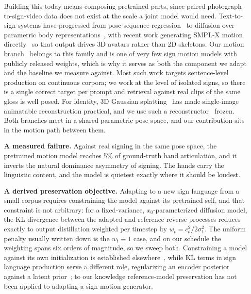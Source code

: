 \documentclass{article}
\begin{document}
Building this today means composing pretrained parts, since paired
photograph-to-sign-video data does not exist at the scale a joint model would
need. Text-to-sign systems have progressed from pose-sequence
regression~\cite{saunders2020progressive} to diffusion over parametric body
representations~\cite{baltatzis2024nsa}, with recent work generating SMPL-X
motion directly~\cite{dong2024signavatar,zuo2025soke} so that output drives 3D
avatars rather than 2D skeletons. Our motion branch~\cite{bensabath2026handmdm}
belongs to this family and is one of very few sign motion models with publicly
released weights, which is why it serves as both the component we adapt and the
baseline we measure against. Most such work targets sentence-level production on
continuous corpora; we work at the level of isolated signs, so there is a single
correct target per prompt and retrieval against real clips of the same gloss is
well posed. For identity, 3D Gaussian splatting~\cite{kerbl20233dgs} has made
single-image animatable reconstruction practical, and we use such a
reconstructor~\cite{qiu2025lhm} frozen. Both branches meet in a shared parametric
pose space, and our contribution sits in the motion path between them.

\noindent\textbf{A measured failure.} Against real signing in the same pose
space, the pretrained motion model reaches 5\% of ground-truth hand articulation,
and it inverts the natural dominance asymmetry of signing. The hands carry the
linguistic content, and the model is quietest exactly where it should be loudest.

\noindent\textbf{A derived preservation objective.} Adapting to a new sign
language from a small corpus requires constraining the model against its
pretrained self, and that constraint is not arbitrary: for a fixed-variance,
$x_0$-parameterized diffusion model, the KL divergence between the adapted and
reference reverse processes reduces exactly to output distillation weighted per
timestep by $w_t = c_t^2/2\sigma_t^2$. The uniform penalty usually written down
is the $w_t \equiv 1$ case, and on our schedule the weighting spans six orders of
magnitude, so we sweep both. Constraining a model against its own initialization
is established elsewhere~\cite{ruiz2023dreambooth,ouyang2022rlhf}, while KL terms
in sign language production serve a different role, regularizing an encoder
posterior against a latent prior~\cite{faure2026vae,higgins2017betavae}; to our
knowledge reference-model preservation has not been applied to adapting a sign
motion generator.
\end{document}
